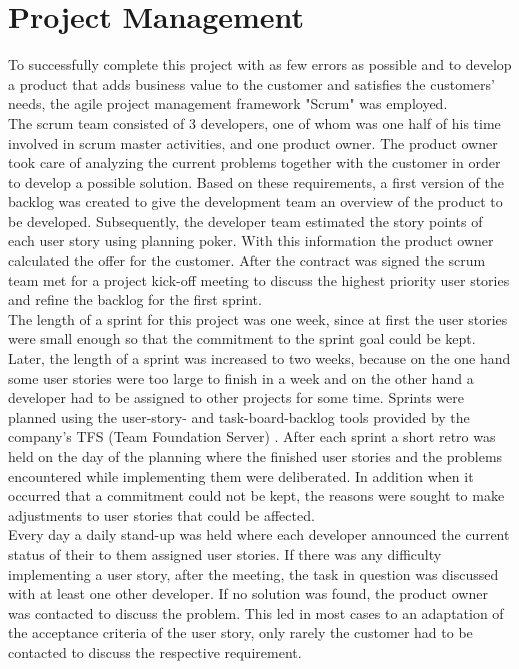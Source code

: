 \documentclass[Bachelor,BIF,english]{twbook}
\begin{document}
\section{Project Management}
To successfully complete this project with as few errors as possible and to develop a product that adds business value to the customer and satisfies the customers' needs, the agile project management framework "Scrum" \cite{Scrum} was employed. 
\\[\baselineskip]
The scrum team consisted of 3 developers, one of whom was one half of his time involved in scrum master activities, and one product owner. The product owner took care of analyzing the current problems together with the customer in order to develop a possible solution. Based on these requirements, a first version of the backlog was created to give the development team an overview of the product to be developed. Subsequently, the developer team estimated the story points of each user story using planning poker. With this information the product owner calculated the offer for the customer. After the contract was signed the scrum team met for a project kick-off meeting to discuss the highest priority user stories and refine the backlog for the first sprint.
\\[\baselineskip]
The length of a sprint for this project was one week, since at first the user stories were small enough so that the commitment to the sprint goal could be kept. Later, the length of a sprint was increased to two weeks, because on the one hand some user stories were too large to finish in a week and on the other hand a developer had to be assigned to other projects for some time. Sprints were planned using the user-story- and task-board-backlog tools provided by the company's TFS (Team Foundation Server) \cite{TFS}. After each sprint a short retro was held on the day of the planning where the finished user stories and the problems encountered while implementing them were deliberated. In addition when it occurred that a commitment could not be kept, the reasons were sought to make adjustments to user stories that could be affected. 
\\[\baselineskip]
Every day a daily stand-up was held where each developer announced the current status of their to them assigned user stories. If there was any difficulty implementing a user story, after the meeting, the task in question was discussed with at least one other developer. If no solution was found, the product owner was contacted to discuss the problem. This led in most cases to an adaptation of the acceptance criteria of the user story, only rarely the customer had to be contacted to discuss the respective requirement. 
\end{document}
